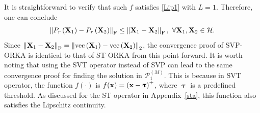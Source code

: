 \documentclass[12pt,draftcls,onecolumn]{IEEEtran}
\begin{document}
It is straightforward to verify that such $f$ satisfies \eqref{Lip1} with $L=1$. Therefore, one can conclude
\begin{equation}
\label{Lip2}
\left\|P_r\left(\mbX_1\right)-P_r\left(\mbX_2\right)\right\|_{\mathrm{F}} \leq \left\|\mbX_1-\mbX_2\right\|_{\mathrm{F}},~\forall\mbX_1, \mbX_2 \in \mathcal{H}.
\end{equation}
Since $\left\|\mathbf{X}_1-\mathbf{X}_2\right\|_{\mathrm{F}}=\left\|\operatorname{vec}\left(\mathbf{X}_1\right)-\operatorname{vec}\left(\mathbf{X}_2\right)\right\|_2$, the convergence proof of SVP-ORKA is identical to that of ST-ORKA from this point forward. It is worth noting that using the SVT operator instead of SVP can lead to the same convergence proof for finding the solution in $\mathcal{P}^{(M)}_1$. This is because in %
SVT operator, the function $f(\cdot)$ is $f(\mathbf{x}) = \left(\mathbf{x}-\boldsymbol{\uptau}\right)^{+}$, where $\boldsymbol{\uptau}$ is a predefined threshold. As discussed for the ST operator in Appendix~\ref{sta},
this function also satisfies the Lipschitz continuity.

\end{document}

